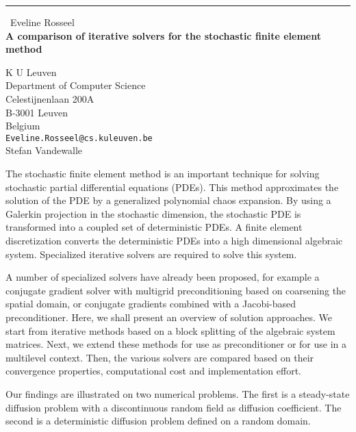 \documentclass{report}
\begin{document}
\begin{center}
\rule{6in}{1pt} \
{\large Eveline Rosseel \\
{\bf A comparison of iterative solvers for the stochastic finite element method}}

K U Leuven \\ Department of Computer Science \\ Celestijnenlaan 200A \\ B-3001 Leuven \\ Belgium
\\
{\tt Eveline.Rosseel@cs.kuleuven.be}\\
Stefan Vandewalle\end{center}

The stochastic finite element method is an important technique for
solving stochastic partial differential equations (PDEs). This method
approximates the solution of the PDE by a generalized polynomial chaos
expansion. By using a Galerkin projection in the stochastic dimension,
the stochastic PDE is transformed into a coupled set of deterministic
PDEs. A finite element discretization converts the deterministic PDEs
into a high dimensional algebraic system. Specialized iterative solvers
are required to solve this system.

A number of specialized solvers have already been proposed, for example a
conjugate gradient solver with multigrid preconditioning based on
coarsening the spatial domain, or conjugate gradients combined with a
Jacobi-based preconditioner. Here, we shall present an overview of
solution approaches. We start from iterative methods based on a block
splitting of the algebraic system matrices. Next, we extend these methods
for use as preconditioner or for use in a multilevel context. Then, the
various solvers are compared based on their convergence properties,
computational cost and implementation effort.

Our findings are illustrated on two numerical problems. The first is a
steady-state diffusion problem with a discontinuous random field as
diffusion coefficient. The second is a deterministic diffusion problem
defined on a random domain.
\end{document}
